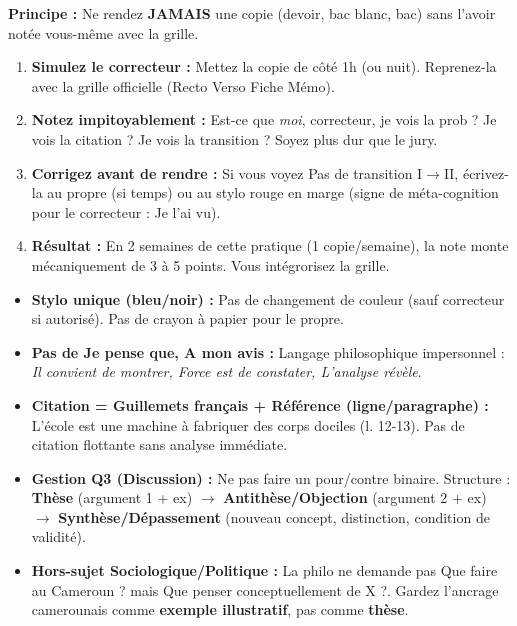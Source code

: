 \documentclass[11pt]{article}
\begin{document}
\begin{methode}[Auto-\'evaluation = Devenir son Propre Correcteur (Le Levier N$^\circ$1)]
\textbf{Principe :} Ne rendez \textbf{JAMAIS} une copie (devoir, bac blanc, bac) sans l'avoir not\'ee vous-m\^eme avec la grille.
\begin{enumerate}
    \item \textbf{Simulez le correcteur :} Mettez la copie de c\^ot\'e 1h (ou nuit). Reprenez-la avec la grille officielle (Recto Verso Fiche M\'emo).
    \item \textbf{Notez impitoyablement :} \og{}Est-ce que \emph{moi}, correcteur, je vois la prob ? Je vois la citation ? Je vois la transition ?\fg{} Soyez plus dur que le jury.
    \item \textbf{Corrigez avant de rendre :} Si vous voyez \og{}Pas de transition I$\rightarrow$II\fg{}, \'ecrivez-la au propre (si temps) ou au stylo rouge en marge (signe de m\'eta-cognition pour le correcteur : \og{}Je l'ai vu\fg{}).
    \item \textbf{R\'esultat :} En 2 semaines de cette pratique (1 copie/semaine), la note monte m\'ecaniquement de 3 \`a 5 points. Vous int\'egrorisez la grille.
\end{enumerate}
\end{methode}

\begin{attention}
\begin{itemize}
    \item \textbf{Stylo unique (bleu/noir) :} Pas de changement de couleur (sauf correcteur si autoris\'e). Pas de crayon \`a papier pour le propre.
    \item \textbf{Pas de \og{}Je pense que\fg{}, \og{}A mon avis\fg{} :} Langage philosophique impersonnel : \textit{\og{}Il convient de montrer\fg{}, \og{}Force est de constater\fg{}, \og{}L'analyse r\'ev\`ele\fg{}}.
    \item \textbf{Citation = Guillemets fran\c{c}ais \og{} \fg{} + R\'ef\'erence (ligne/paragraphe) :} \og{}L'\'ecole est une machine \`a fabriquer des corps dociles\fg{} (l. 12-13). Pas de citation \og{}flottante\fg{} sans analyse imm\'ediate.
    \item \textbf{Gestion Q3 (Discussion) :} Ne pas faire un \og{}pour/contre\fg{} binaire. Structure : \textbf{Th\`ese} (argument 1 + ex) $\rightarrow$ \textbf{Antith\`ese/Objection} (argument 2 + ex) $\rightarrow$ \textbf{Synth\`ese/D\'epassement} (nouveau concept, distinction, condition de validit\'e).
    \item \textbf{Hors-sujet \og{}Sociologique/Politique\fg{} :} La philo ne demande pas \og{}Que faire au Cameroun ?\fg{} mais \og{}Que penser conceptuellement de X ?\fg{}. Gardez l'ancrage camerounais comme \textbf{exemple illustratif}, pas comme \textbf{th\`ese}.
\end{itemize}
\end{attention}
\end{document}

